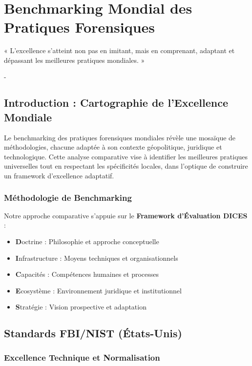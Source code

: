 \chapter{Benchmarking Mondial des Pratiques Forensiques}

\epigraph{« L'excellence s'atteint non pas en imitant, mais en comprenant, adaptant et dépassant les meilleures pratiques mondiales. »}{-\hfill \textit{}}

\section{Introduction : Cartographie de l'Excellence Mondiale}

Le benchmarking des pratiques forensiques mondiales révèle une mosaïque de méthodologies, chacune adaptée à son contexte géopolitique, juridique et technologique. Cette analyse comparative vise à identifier les meilleures pratiques universelles tout en respectant les spécificités locales, dans l'optique de construire un framework d'excellence adaptatif.

\subsection{Méthodologie de Benchmarking}

Notre approche comparative s'appuie sur le \textbf{Framework d'Évaluation DICES} :
\begin{itemize}
\item \textbf{D}octrine : Philosophie et approche conceptuelle
\item \textbf{I}nfrastructure : Moyens techniques et organisationnels  
\item \textbf{C}apacités : Compétences humaines et processes
\item \textbf{E}cosystème : Environnement juridique et institutionnel
\item \textbf{S}tratégie : Vision prospective et adaptation
\end{itemize}

\section{Standards FBI/NIST (États-Unis)}

\subsection{Excellence Technique et Normalisation}

